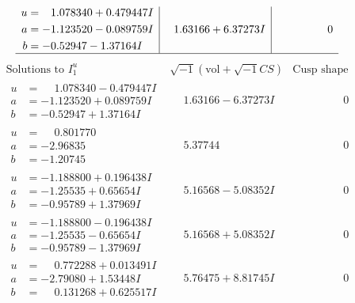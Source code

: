 \documentclass[1p]{elsarticle_modified}
\theoremstyle{definition}
\newcommand{\I}{\sqrt{-1}}
\begin{document}
$$\begin{array}{c|c|c}
\begin{aligned}
u &= \phantom{-}1.078340 + 0.479447 I \\
a &= -1.123520 - 0.089759 I \\
b &= -0.52947 - 1.37164 I\end{aligned}
 & \phantom{-}1.63166 + 6.37273 I & \phantom{-0.000000 } 0\\
 \hline 
 \end{array}$$\newpage$$\begin{array}{c|c|c}  
\text{Solutions to }I^u_{1}& \I (\text{vol} + \sqrt{-1}CS) & \text{Cusp shape}\\
 \hline 
\begin{aligned}
u &= \phantom{-}1.078340 - 0.479447 I \\
a &= -1.123520 + 0.089759 I \\
b &= -0.52947 + 1.37164 I\end{aligned}
 & \phantom{-}1.63166 - 6.37273 I & \phantom{-0.000000 } 0 \\ \hline\begin{aligned}
u &= \phantom{-}0.801770\phantom{ +0.000000I} \\
a &= -2.96835\phantom{ +0.000000I} \\
b &= -1.20745\phantom{ +0.000000I}\end{aligned}
 & \phantom{-}5.37744\phantom{ +0.000000I} & \phantom{-0.000000 } 0 \\ \hline\begin{aligned}
u &= -1.188800 + 0.196438 I \\
a &= -1.25535 + 0.65654 I \\
b &= -0.95789 + 1.37969 I\end{aligned}
 & \phantom{-}5.16568 - 5.08352 I & \phantom{-0.000000 } 0 \\ \hline\begin{aligned}
u &= -1.188800 - 0.196438 I \\
a &= -1.25535 - 0.65654 I \\
b &= -0.95789 - 1.37969 I\end{aligned}
 & \phantom{-}5.16568 + 5.08352 I & \phantom{-0.000000 } 0 \\ \hline\begin{aligned}
u &= \phantom{-}0.772288 + 0.013491 I \\
a &= -2.79080 + 1.53448 I \\
b &= \phantom{-}0.131268 + 0.625517 I\end{aligned}
 & \phantom{-}5.76475 + 8.81745 I & \phantom{-0.000000 } 0 \\ \hline\begin{aligned}

\end{aligned}
\end{array}$$
\end{document}
